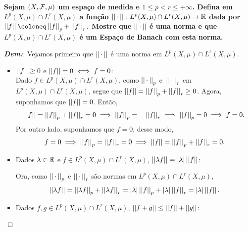 \textbf{Sejam $(X, \mcal F, \mu)$ um espaço de medida e $1 \le p < r \le +\infty$. 
Defina em $L^p(X, \mu) \cap L^r(X, \mu)$ a função $\pnorm {} {\,\cdot\,}:
L^p(X, \mu) \cap L^r(X, \mu) \rightarrow \bR$ dada por 
$\pnorm {} f \coloneq \pnorm p f + \pnorm r f$. Mostre que 
$\pnorm {} {\, \cdot \,}$ é uma norma e que $L^p(X,\mu)\cap L^r(X, \mu)$ é 
um Espaço de Banach com esta norma.}
\begin{proof}[\textbf{Dem:}]
Vejamos primeiro que $\pnorm {} {\, \cdot \,}$ é uma norma em $L^p(X, \mu) \cap L^r(X, \mu)$.
\begin{itemize}
  \item $\snorm f \ge 0$ e $\snorm{f} = 0 \iff f = 0$:\\
    Dado $f \in L^p(X, \mu) \cap L^r(X,\mu)$, como $\pnorm p {\, \cdot \,}$ e 
    $\pnorm r {\, \cdot \,}$ em $L^p(X, \mu) \cap L^r(X, \mu)$, segue que 
    $\snorm f = \pnorm p f + \pnorm r f \ge 0$. Agora, suponhamos que $\snorm f = 0$. Então, 
    \begin{align*}
      \snorm f = \pnorm p f + \pnorm r f = 0 \implies \pnorm p f = - \pnorm r f \implies 
      \pnorm p f = 0 \implies f = 0.
    \end{align*}
    Por outro lado, suponhamos que $f = 0$, desse modo, 
    \begin{align*}
      f = 0 \implies \pnorm p f = \pnorm r f = 0 \implies 
      \snorm f = \pnorm p f + \pnorm r f =0.
    \end{align*}
  \item Dados $\lambda \in \bR$ e $f \in L^p(X, \mu)\cap L^r(X, \mu)$,
    $\snorm{\lambda f} = \mparth{\lambda} \snorm f$:

    Ora, como $\pnorm p {\, \cdot \,}$ e 
    $\pnorm r {\, \cdot \,}$ são normas em $L^p(X, \mu) \cap L^r(X, \mu)$, 
    \begin{align*}
      \mparth{\mparth{\lambda f}} = \pnorm p {\lambda f} + \pnorm r {\lambda f}
      = \mparth \lambda \pnorm p f + \mparth \lambda \pnorm r f = \mparth \lambda \snorm f.
    \end{align*}
  \item Dados $f, g \in L^p(X,\mu)\cap L^r(X, \mu)$, $\snorm {f + g} \le \snorm f + \snorm g$:
    

\end{itemize}
\end{proof}
